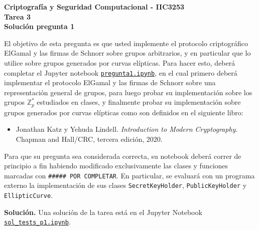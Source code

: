 \documentclass[11pt]{article}
\begin{document}
\begin{center}
  \bf Criptografía y Seguridad Computacional - IIC3253\\
  \bf Tarea 3\\
  \bf Solución pregunta 1
\end{center}

\bigskip

\noindent

\newcommand{\bbit}{\#\text{Bit}}
\newcommand{\dv}{\text{Div}}

El objetivo de esta pregunta es que usted implemente el protocolo
criptográfico ElGamal y las firmas de Schnorr sobre grupos
arbitrarios, y en particular que lo utilice sobre grupos generados por
curvas elípticas. Para hacer esto, deberá completar el Jupyter
notebook
\href{https://github.com/IIC3253/2023/blob/main/tareas/tarea\%203/enunciado/questions/p1/pregunta1.ipynb}{\texttt{pregunta1.ipynb}},
en el cual primero deberá implementar el protocolo ElGamal y las
firmas de Schnorr sobre una representación general de grupos, para
luego probar su implementación sobre los grupos $\mathbb{Z}_p^*$
estudiados en clases, y finalmente probar su implementación sobre grupos
generados por curvas elípticas como son definidos en el siguiente
libro:
\begin{itemize}
  \item Jonathan Katz y Yehuda Lindell. {\em Introduction to Modern Cryptography}. Chapman and Hall/CRC, tercera edición, 2020.
\end{itemize}
Para que su pregunta sea considerada correcta, su notebook deberá
correr de principio a fin habiendo modificado exclusivamente las
clases y funciones marcadas con \texttt{\#\#\#\#\# POR COMPLETAR}. En
particular, se evaluará con un programa externo la implementación de
sus clases \texttt{SecretKeyHolder}, \texttt{PublicKeyHolder} y
\texttt{EllipticCurve}.



\bigskip

\noindent
    {\bf Solución.}
    Una solución de la tarea está en el Jupyter Notebook
  \href{https://github.com/IIC3253/2023/blob/main/tareas/tarea\%203/soluciones/p1/sol_tests_p1.ipynb}{\texttt{sol\_tests\_p1.ipynb}}.
  
\end{document}
